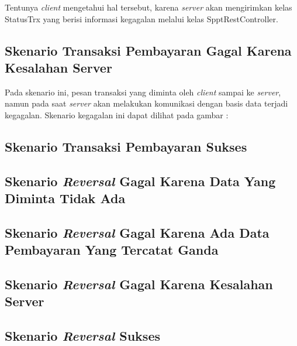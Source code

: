Tentunya \textit{client} mengetahui hal tersebut, karena \textit{server} akan mengirimkan kelas StatusTrx yang berisi informasi kegagalan melalui kelas SpptRestController.

\subsection{Skenario Transaksi Pembayaran Gagal Karena Kesalahan Server}

Pada skenario ini, pesan transaksi yang diminta oleh \textit{client} sampai ke \textit{server}, namun pada saat \textit{server} akan melakukan komunikasi dengan basis data terjadi kegagalan. Skenario kegagalan ini dapat dilihat pada gambar :

\subsection{Skenario Transaksi Pembayaran Sukses}
\subsection{Skenario \textit{Reversal} Gagal Karena Data Yang Diminta Tidak Ada}
\subsection{Skenario \textit{Reversal} Gagal Karena Ada Data Pembayaran Yang Tercatat Ganda}
\subsection{Skenario \textit{Reversal} Gagal Karena Kesalahan Server}
\subsection{Skenario \textit{Reversal} Sukses}

